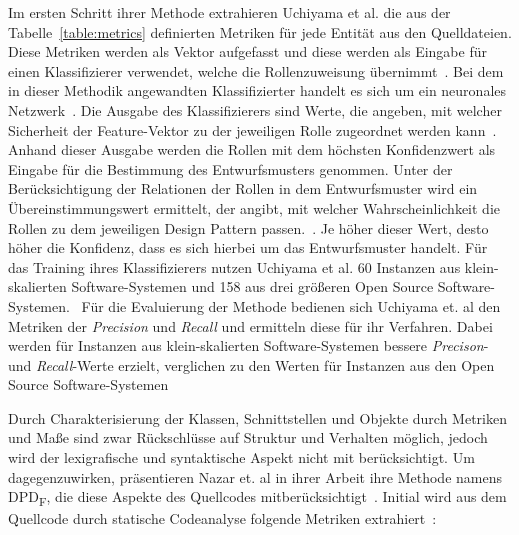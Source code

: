 Im ersten Schritt ihrer Methode extrahieren Uchiyama et al. die aus der Tabelle~\ref{table:metrics} definierten Metriken für jede Entität aus den Quelldateien. 
Diese Metriken werden als Vektor aufgefasst und diese werden als Eingabe für einen Klassifizierer verwendet, welche die Rollenzuweisung übernimmt~\cite[S. 5]{Uchiyama2014}.
Bei dem in dieser Methodik angewandten Klassifizierter handelt es sich um ein neuronales Netzwerk~\cite[S. 4]{Uchiyama2014}.
Die Ausgabe des Klassifizierers sind Werte, die angeben, mit welcher Sicherheit der Feature-Vektor zu der jeweiligen Rolle zugeordnet werden kann~\cite[S. 5]{Uchiyama2014}.
Anhand dieser Ausgabe werden die Rollen mit dem höchsten Konfidenzwert als Eingabe für die Bestimmung des Entwurfsmusters genommen. Unter der Berücksichtigung der Relationen der Rollen in dem Entwurfsmuster wird ein Übereinstimmungswert ermittelt, der angibt, mit welcher Wahrscheinlichkeit die Rollen zu dem jeweiligen Design Pattern passen.~\cite[S. 6]{Uchiyama2014}. Je höher dieser Wert, desto höher die Konfidenz, dass es sich hierbei um das Entwurfsmuster handelt.
Für das Training ihres Klassifizierers nutzen Uchiyama et al. 60 Instanzen aus klein-skalierten Software-Systemen und 158 aus drei größeren Open Source Software-Systemen.~\cite[S. 7]{Uchiyama2014}
Für die Evaluierung der Methode bedienen sich Uchiyama et. al den Metriken der \textit{Precision} und \textit{Recall} und ermitteln diese für ihr Verfahren.
Dabei werden für Instanzen aus klein-skalierten Software-Systemen bessere \textit{Precison}- und \textit{Recall}-Werte erzielt, verglichen zu den Werten für Instanzen aus den Open Source Software-Systemen~\cite[S. 8]{Uchiyama2014}

\smallbreak

Durch Charakterisierung der Klassen, Schnittstellen und Objekte durch Metriken und Maße sind zwar Rückschlüsse auf Struktur und Verhalten möglich, jedoch wird der lexigrafische und syntaktische Aspekt nicht mit berücksichtigt.
Um dagegenzuwirken, präsentieren Nazar et. al in ihrer Arbeit ihre Methode namens DPD\textsubscript{F}, die diese Aspekte des Quellcodes mitberücksichtigt~\cite[S. 1]{Nazar2020}.
Initial wird aus dem Quellcode durch statische Codeanalyse folgende Metriken extrahiert~\cite[S. 5]{Nazar2020}:

